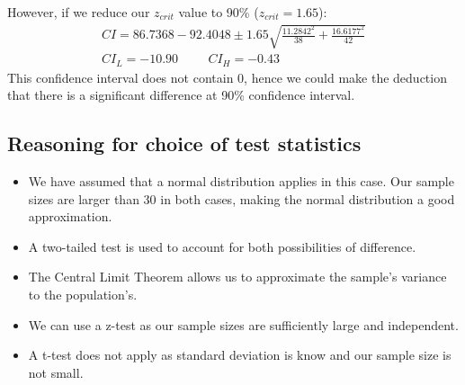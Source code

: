 \documentclass[11pt]{article}
\numberwithin{equation}{section}
\begin{document}
However, if we reduce our $z_{crit}$ value to 90\% ($z_{crit} = 1.65$):
\begin{gather}
    CI = 86.7368 - 92.4048 \pm 1.65 \sqrt{\frac{11.2842^2}{38} + \frac{16.6177^2}{42}}\\
    CI_L = -10.90 \hspace{1cm} CI_H = -0.43
\end{gather} 
This confidence interval does not contain 0, hence we could make the deduction that there is a significant difference at 90\% confidence interval.
\subsection{Reasoning for choice of test statistics}
\begin{itemize}
    \item We have assumed that a normal distribution applies in this case. Our sample sizes are larger than 30 in both cases, making the normal distribution a good approximation.
    \item A two-tailed test is used to account for both possibilities of difference. 
    \item The Central Limit Theorem allows us to approximate the sample's variance to the population's.
    \item We can use a z-test as our sample sizes are sufficiently large and independent. 
    \item A t-test does not apply as standard deviation is know and our sample size is not small.
\end{itemize}
\end{document}
